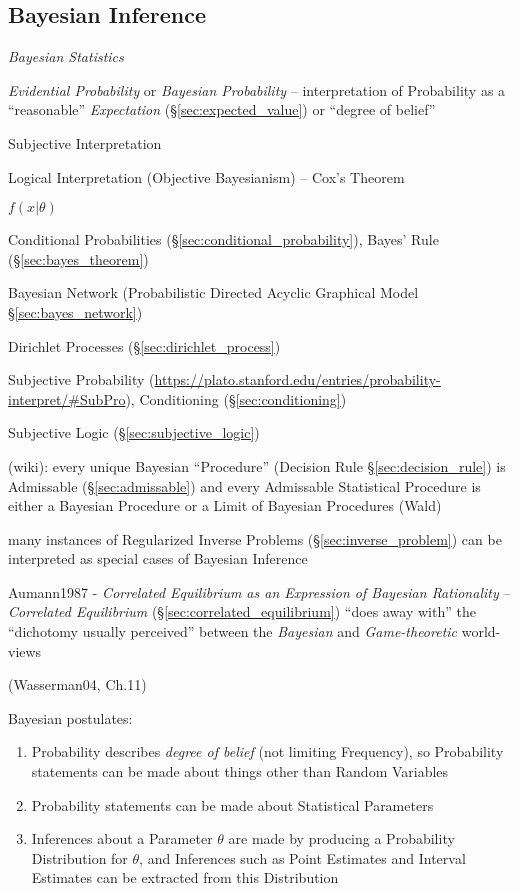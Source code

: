 \subsection{Bayesian Inference}\label{sec:bayesian_inference}

\emph{Bayesian Statistics}

\emph{Evidential Probability} or \emph{Bayesian Probability} -- interpretation
of Probability as a ``reasonable'' \emph{Expectation}
(\S\ref{sec:expected_value}) or ``degree of belief''

Subjective Interpretation

Logical Interpretation (Objective Bayesianism) -- Cox's Theorem

$f(x | \theta)$

Conditional Probabilities (\S\ref{sec:conditional_probability}), Bayes' Rule
(\S\ref{sec:bayes_theorem})

\fist Bayesian Network (Probabilistic Directed Acyclic Graphical Model
\S\ref{sec:bayes_network})

\fist Dirichlet Processes (\S\ref{sec:dirichlet_process})

Subjective Probability %
(\url{https://plato.stanford.edu/entries/probability-interpret/#SubPro}),
Conditioning (\S\ref{sec:conditioning})

\fist Subjective Logic (\S\ref{sec:subjective_logic})

(wiki): every unique Bayesian ``Procedure'' (Decision Rule
\S\ref{sec:decision_rule}) is Admissable (\S\ref{sec:admissable}) and every
Admissable Statistical Procedure is either a Bayesian Procedure or a Limit of
Bayesian Procedures (Wald)

many instances of Regularized Inverse Problems (\S\ref{sec:inverse_problem}) can
be interpreted as special cases of Bayesian Inference

\fist Aumann1987 - \emph{Correlated Equilibrium as an Expression of Bayesian
  Rationality} -- \emph{Correlated Equilibrium}
(\S\ref{sec:correlated_equilibrium}) ``does away with'' the ``dichotomy usually
perceived'' between the \emph{Bayesian} and \emph{Game-theoretic} world-views

(Wasserman04, Ch.11)

Bayesian postulates:
\begin{enumerate}
  \item Probability describes \emph{degree of belief} (not limiting Frequency),
    so Probability statements can be made about things other than Random
    Variables
  \item Probability statements can be made about Statistical Parameters
  \item Inferences about a Parameter $\theta$ are made by producing a
    Probability Distribution for $\theta$, and Inferences such as Point
    Estimates and Interval Estimates can be extracted from this Distribution
\end{enumerate}

